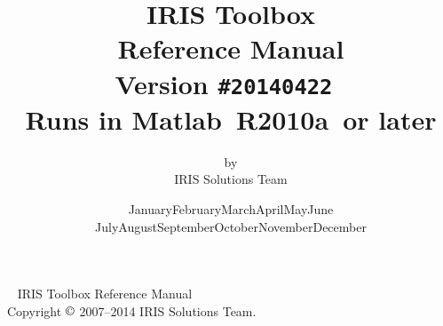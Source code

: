 \documentclass[letterpaper,fleqn,10pt]{article}
\newcommand{\mycmss}{\fontfamily{lcmss}\selectfont}
\newcommand\Today{\number\day\space \ifcase\month\or
  January\or February\or March\or April\or May\or June\or
  July\or August\or September\or October\or November\or December\fi
  \space\number\year}
\newcommand{\irisversion}{20140422}
\newcommand{\matlabversion}{R2010a}
\begin{document}
\thispagestyle{empty}
\title{\vspace*{0.2\textheight}\huge\mdseries IRIS Toolbox\\Reference Manual \\[24pt] \rmfamily \large \mdseries Version \texttt{\#\irisversion}\ \\[6pt]
Runs in Matlab\raisebox{5pt}{\tiny $\copyright$}\ \matlabversion\ or later}
\author{by \\[2pt] IRIS Solutions Team}
\date{\bigskip\bigskip \Today\\[5pt]}
\maketitle
\thispagestyle{empty}
\clearpage

~
\vfill
IRIS Toolbox Reference Manual \\
Copyright $\copyright$ 2007--2014 IRIS Solutions Team.
\thispagestyle{empty}



\clearpage
{}




\clearpage
\tableofcontents

\clearpage
{}

\end{document}
